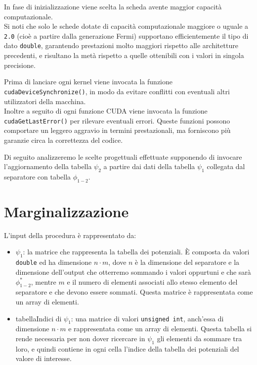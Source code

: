 \documentclass[a4paper]{article}   %
\begin{document}
In fase di inizializzazione viene scelta la scheda avente maggior capacità computazionale.\\
Si noti che solo le schede dotate di capacità computazionale maggiore o uguale a {\tt 2.0} (cioè a partire dalla generazione Fermi) supportano efficientemente il tipo di dato {\tt double}, garantendo prestazioni molto maggiori rispetto alle architetture precedenti, e risultano la metà rispetto a quelle ottenibili con i valori in singola precisione. 

Prima di lanciare ogni kernel viene invocata la funzione {\tt cudaDeviceSynchronize()}, in modo da evitare conflitti con eventuali altri utilizzatori della macchina.\\
Inoltre a seguito di ogni funzione CUDA viene invocata la funzione {\tt cudaGetLastError()} per rilevare eventuali errori.
Queste funzioni possono comportare un leggero aggravio in termini prestazionali, ma forniscono più garanzie circa la correttezza del codice.

Di seguito analizzeremo le scelte progettuali effettuate supponendo di invocare l'aggiornamento della tabella $\psi_2$ a partire dai dati della tabella $\psi_1$ collegata dal separatore con tabella $\phi_{1-2}$.

\section{Marginalizzazione}

L'input della procedura è rappresentato da:
\begin{itemize}
\item $\psi_1$: la matrice che rappresenta la tabella dei potenziali. \`E composta da valori {\tt double} ed ha dimensione $n \cdot m$, dove $n$ è la dimensione del separatore e la dimensione dell'output che otterremo sommando i valori oppurtuni e che sarà $\phi_{1-2}^*$, mentre $m$ e il numero di elementi associati allo stesso elemento del separatore e che devono essere sommati. Questa matrice è rappresentata come un array di elementi.
\item tabellaIndici di $\psi_1$: una matrice di valori {\tt unsigned int}, anch'essa di dimensione $n \cdot m$ e rappresentata come un array di elementi. Questa tabella si rende necessaria per non dover ricercare in $\psi_1$ gli elementi da sommare tra loro, e quindi contiene in ogni cella l’indice della tabella dei potenziali del valore di interesse. 
\end{itemize}
\end{document}
